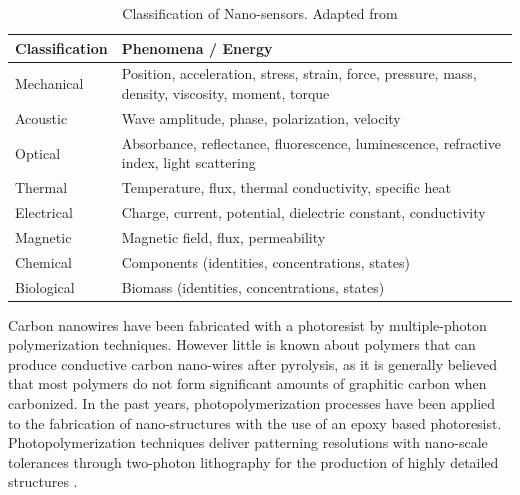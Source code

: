 \begin{table}[!th]
\centering
\caption[Classification of Nano-sensors]{Classification of Nano-sensors. Adapted from \cite{Khanna2016}}
\begin{tabularx}{\textwidth}{lX}
\hline
\textbf{Classification} & \textbf{Phenomena / Energy} \\
\hline
Mechanical & Position, acceleration, stress, strain, force, pressure, mass, density, viscosity, moment, torque \\
Acoustic & Wave amplitude, phase, polarization, velocity \\
Optical & Absorbance, reflectance, fluorescence, luminescence, refractive index, light scattering \\
Thermal & Temperature, flux, thermal conductivity, specific heat \\
Electrical & Charge, current, potential, dielectric constant, conductivity \\
Magnetic & Magnetic field, flux, permeability \\
Chemical & Components (identities, concentrations, states) \\
Biological & Biomass (identities, concentrations, states) \\
\hline
\end{tabularx}
\label{tab:classificationOfNanosensors}
\end{table}

Carbon nanowires have been fabricated with a photoresist by multiple-photon polymerization techniques. However little is known about polymers that can produce conductive carbon nano-wires after pyrolysis, as it is generally believed that most polymers do not form significant amounts of graphitic carbon when carbonized.
In the past years, photopolymerization processes have been applied to the fabrication of nano-structures with the use of an epoxy based photoresist. \cite{Boer2014} Photopolymerization techniques deliver patterning resolutions with nano-scale tolerances through two-photon lithography for the production of highly detailed structures \cite{Hribar2014}.

